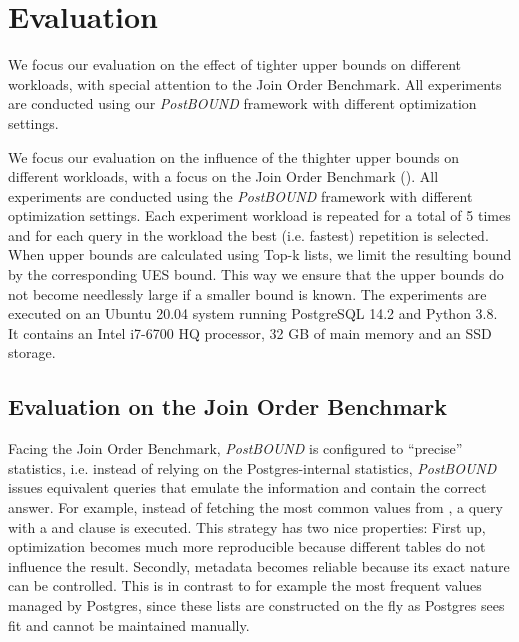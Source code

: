 \section{Evaluation}
\label{sec:Eval}

We focus our evaluation on the effect of tighter upper bounds on different workloads, with special attention to the Join Order Benchmark. All experiments are conducted using our \emph{PostBOUND} framework with different optimization settings. 

We focus our evaluation on the influence of the thighter upper bounds on different workloads, with a focus on the Join Order Benchmark (). All experiments are conducted using the \emph{PostBOUND} framework with different optimization settings. Each experiment workload is repeated for a total of 5 times and for each query in the workload the best (i.e. fastest) repetition is selected. When upper bounds are calculated using Top-k lists, we limit the resulting bound by the corresponding UES bound. This way we ensure that the upper bounds do not become needlessly large if a smaller bound is known. The experiments are executed on an Ubuntu 20.04 system running PostgreSQL 14.2 and Python 3.8. It contains an Intel i7-6700 HQ processor, 32 GB of main memory and an SSD storage.

\subsection{Evaluation on the Join Order Benchmark}
\label{sec:eval-job}

Facing the Join Order Benchmark, \emph{PostBOUND} is configured to ``precise'' statistics, i.e. instead of relying on the Postgres-internal statistics, \emph{PostBOUND} issues equivalent queries that emulate the information and contain the correct answer. For example, instead of fetching the most common values from , a  query with a  and  clause is executed. This strategy has two nice properties: First up, optimization becomes much more reproducible because different  tables do not influence the result. Secondly, metadata becomes reliable because its exact nature can be controlled. This is in contrast to for example the most frequent values managed by Postgres, since these lists are constructed on the fly as Postgres sees fit and cannot be maintained manually.

